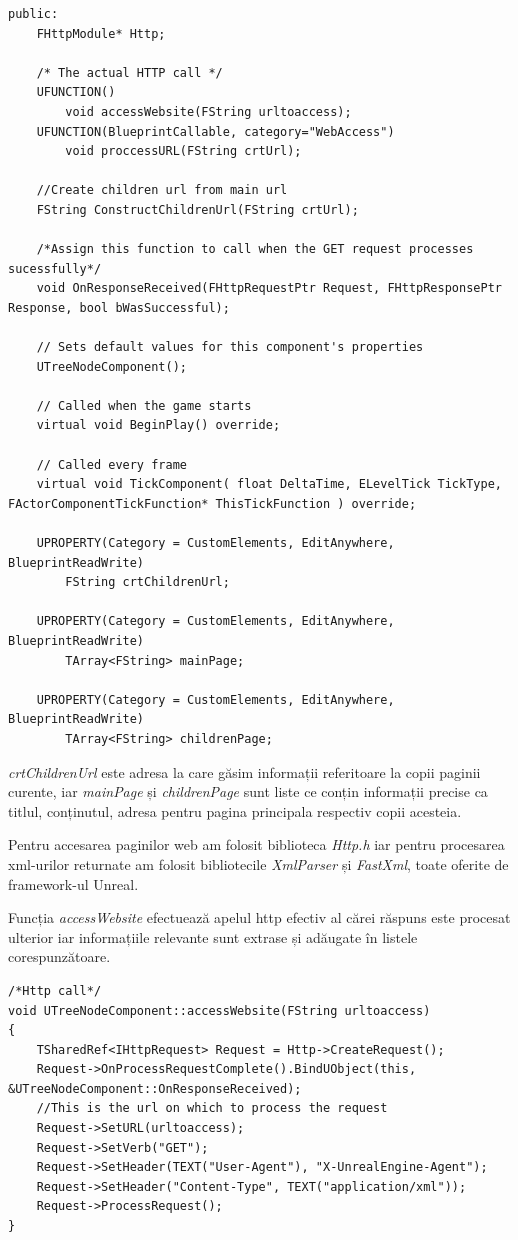 \begin{lstlisting}[breaklines=true, postbreak=\mbox{\textcolor{red}{$\hookrightarrow$}\space}, caption=Snippet din fișierul header al componentei \textit{TreeNode} în care se observă funcții și variabile utilizate în blueprint-uri]
public:	
	FHttpModule* Http;

	/* The actual HTTP call */
	UFUNCTION()
		void accessWebsite(FString urltoaccess);
	UFUNCTION(BlueprintCallable, category="WebAccess")
		void proccessURL(FString crtUrl);

	//Create children url from main url
	FString ConstructChildrenUrl(FString crtUrl);

	/*Assign this function to call when the GET request processes sucessfully*/
	void OnResponseReceived(FHttpRequestPtr Request, FHttpResponsePtr Response, bool bWasSuccessful);

	// Sets default values for this component's properties
	UTreeNodeComponent();

	// Called when the game starts
	virtual void BeginPlay() override;
	
	// Called every frame
	virtual void TickComponent( float DeltaTime, ELevelTick TickType, FActorComponentTickFunction* ThisTickFunction ) override;

	UPROPERTY(Category = CustomElements, EditAnywhere, BlueprintReadWrite)
		FString crtChildrenUrl;

	UPROPERTY(Category = CustomElements, EditAnywhere, BlueprintReadWrite)
		TArray<FString> mainPage;

	UPROPERTY(Category = CustomElements, EditAnywhere, BlueprintReadWrite)
		TArray<FString> childrenPage;
\end{lstlisting}

\textit{crtChildrenUrl} este adresa la care găsim informații referitoare la copii paginii curente, iar \textit{mainPage} și \textit{childrenPage} sunt liste ce conțin informații precise ca titlul, conținutul, adresa pentru pagina principala respectiv copii acesteia.

Pentru accesarea paginilor web am folosit biblioteca \textit{Http.h} iar pentru procesarea xml-urilor returnate am folosit bibliotecile \textit{XmlParser} și \textit{FastXml}, toate oferite de framework-ul Unreal.

Funcția \textit{accessWebsite} efectuează apelul http efectiv al cărei răspuns este procesat ulterior iar informațiile relevante sunt extrase și adăugate în listele corespunzătoare.

\begin{lstlisting}[breaklines=true, postbreak=\mbox{\textcolor{red}{$\hookrightarrow$}\space}, caption=Funcția ce efectuează apelul http]
/*Http call*/
void UTreeNodeComponent::accessWebsite(FString urltoaccess)
{
	TSharedRef<IHttpRequest> Request = Http->CreateRequest();
	Request->OnProcessRequestComplete().BindUObject(this, &UTreeNodeComponent::OnResponseReceived);
	//This is the url on which to process the request
	Request->SetURL(urltoaccess);
	Request->SetVerb("GET");
	Request->SetHeader(TEXT("User-Agent"), "X-UnrealEngine-Agent");
	Request->SetHeader("Content-Type", TEXT("application/xml"));
	Request->ProcessRequest();
}
\end{lstlisting}

